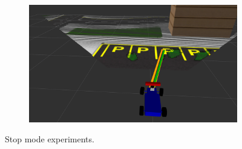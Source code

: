 \begin{figure}[h]
\begin{subfigure}[b]{0.45\linewidth}
  \end{subfigure}
  \begin{subfigure}[b]{0.45\linewidth}
      \includegraphics[width=\linewidth]{figures/experiments/parking-slot-pc.png}
  \end{subfigure}
  \caption{Stop mode experiments.}
  \label{figure:stop}
\end{figure}
